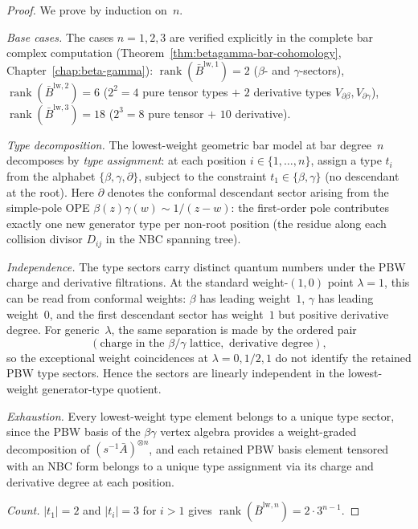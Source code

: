 \begin{proof}
We prove by induction on~$n$.

\emph{Base cases.} The cases $n = 1, 2, 3$ are verified explicitly in the
complete bar complex computation (Theorem~\ref{thm:betagamma-bar-cohomology},
Chapter~\ref{chap:beta-gamma}):
$\operatorname{rank}(\bar{B}^{\mathrm{lw},1}) = 2$ ($\beta$- and $\gamma$-sectors),
$\operatorname{rank}(\bar{B}^{\mathrm{lw},2}) = 6$ ($2^2 = 4$ pure tensor types $+$ $2$
derivative types $V_{\partial\beta}, V_{\partial\gamma}$),
$\operatorname{rank}(\bar{B}^{\mathrm{lw},3}) = 18$ ($2^3 = 8$ pure tensor $+$ $10$ derivative).

\emph{Type decomposition.} The lowest-weight geometric bar model at
bar degree~$n$
decomposes by \emph{type assignment}: at each position
$i \in \{1, \ldots, n\}$, assign a type $t_i$ from the alphabet
$\{\beta, \gamma, \partial\}$, subject to the constraint $t_1 \in \{\beta, \gamma\}$
(no descendant at the root). Here $\partial$ denotes the conformal
descendant sector arising from the simple-pole OPE
$\beta(z)\gamma(w) \sim 1/(z{-}w)$: the first-order pole contributes
exactly one new generator type per non-root position (the residue
along each collision divisor $D_{ij}$ in the NBC spanning tree).

\emph{Independence.} The type sectors carry distinct quantum numbers
under the PBW charge and derivative filtrations. At the standard
weight-$(1,0)$ point $\lambda=1$, this can be read from conformal
weights: $\beta$ has leading weight~$1$, $\gamma$ has leading
weight~$0$, and the first descendant sector has weight~$1$ but
positive derivative degree. For generic~$\lambda$, the same separation
is made by the ordered pair
\[
(\text{charge in the }\beta/\gamma\text{ lattice},
 \text{ derivative degree}),
\]
so the exceptional weight coincidences at $\lambda=0,1/2,1$ do not
identify the retained PBW type sectors. Hence the sectors are linearly
independent in the lowest-weight generator-type quotient.

\emph{Exhaustion.} Every lowest-weight type element belongs
to a unique type sector, since the PBW basis of the $\beta\gamma$ vertex
algebra provides a weight-graded decomposition of
$(s^{-1}\bar{A})^{\otimes n}$, and each retained PBW basis element
tensored with an NBC form belongs to a
unique type assignment via its charge and derivative degree at each
position.

\emph{Count.} $|t_1| = 2$ and $|t_i| = 3$ for $i > 1$ gives
$\operatorname{rank}(\bar{B}^{\mathrm{lw},n}) = 2 \cdot 3^{n-1}$.
\end{proof}

